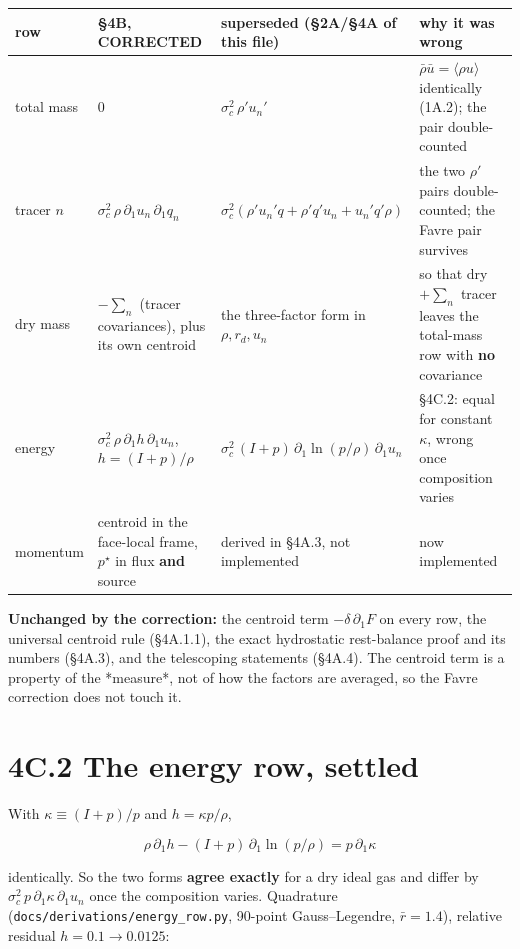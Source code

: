 \documentclass[11pt,a4paper]{article}
\begin{document}
\begin{longtable}{llll}
\toprule
row & §4B, CORRECTED & superseded (§2A/§4A of this file) & why it was wrong \\
\midrule
total mass & $0$ & $\sigma_c^2\,\rho'u_n'$ & $\bar\rho\bar u=\langle\rho u\rangle$ identically (1A.2); the pair double-counted \\
tracer $n$ & $\sigma_c^2\,\rho\,\partial_1u_n\,\partial_1q_n$ & $\sigma_c^2(\rho'u_n'q+\rho'q'u_n+u_n'q'\rho)$ & the two $\rho'$ pairs double-counted; the Favre pair survives \\
dry mass & $-\sum_n$ (tracer covariances), plus its own centroid & the three-factor form in $\rho,r_d,u_n$ & so that dry $+\sum_n$ tracer leaves the total-mass row with \textbf{no} covariance \\
energy & $\sigma_c^2\,\rho\,\partial_1h\,\partial_1u_n$, $h=(I+p)/\rho$ & $\sigma_c^2\,(I+p)\,\partial_1\ln(p/\rho)\,\partial_1u_n$ & §4C.2: equal for constant $\kappa$, wrong once composition varies \\
momentum & centroid in the face-local frame, $p^\star$ in flux \textbf{and} source & derived in §4A.3, not implemented & now implemented \\
\bottomrule
\end{longtable}

\textbf{Unchanged by the correction:} the centroid term $-\delta\,\partial_1F$ on every
row, the universal centroid rule (§4A.1.1), the exact hydrostatic rest-balance
proof and its numbers (§4A.3), and the telescoping statements (§4A.4). The
centroid term is a property of the *measure*, not of how the factors are
averaged, so the Favre correction does not touch it.

\section*{4C.2 The energy row, settled}

With $\kappa\equiv(I+p)/p$ and $h=\kappa p/\rho$,

\begin{equation*}
\boxed{\;\rho\,\partial_1h-(I+p)\,\partial_1\ln(p/\rho)=p\,\partial_1\kappa\;}
\tag{4C.1}
\end{equation*}

identically. So the two forms \textbf{agree exactly} for a dry ideal gas and differ by
$\sigma_c^2\,p\,\partial_1\kappa\,\partial_1u_n$ once the composition varies.
Quadrature (\texttt{docs/derivations/energy\_row.py}, 90-point Gauss–Legendre,
$\bar r=1.4$), relative residual $h=0.1\to0.0125$:
\end{document}

